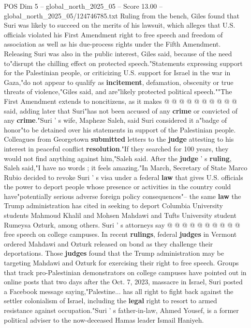 \begin{textsample}{POS Dim 5 – global\_north\_2025\_05 – Score 13.00 – global\_north\_2025\_05/124746785.txt}
Ruling from the bench, Giles found that Suri was likely to succeed on the merits of his lawsuit, which alleges that U.S. officials violated his First Amendment right to free speech and freedom of association as well as his due-process rights under the Fifth Amendment.
Releasing Suri was also in the public interest, Giles said, because of the need to"disrupt the chilling effect on protected speech."Statements expressing support for the Palestinian people, or criticizing U.S. support for Israel in the war in Gaza,"do not appear to qualify as \textbf{incitement}, defamation, obscenity or true threats of violence,"Giles said, and are"likely protected political speech.""The First Amendment extends to noncitizens, as it makes @ @ @ @ @ @ @ @ @ @ said, adding later that Suri"has not been accused of any \textbf{crime} or convicted of any \textbf{crime}."Suri ' s wife, Mapheze Saleh, said Suri considered it a"badge of honor"to be detained over his statements in support of the Palestinian people.
Colleagues from Georgetown \textbf{submitted} letters to the \textbf{judge} attesting to his interest in peaceful conflict \textbf{resolution}."If they searched for 100 years, they would not find anything against him,"Saleh said.
After the \textbf{judge} ' s \textbf{ruling}, Saleh said,"I have no words ; it feels amazing."In March, Secretary of State Marco Rubio decided to revoke Suri ' s visa under a federal \textbf{law} that gives U.S. officials the power to deport people whose presence or activities in the country could have"potentially serious adverse foreign policy consequences"-- the same \textbf{law} the Trump administration has cited in seeking to deport Columbia University students Mahmoud Khalil and Mohsen Mahdawi and Tufts University student Rumeysa Ozturk, among others.
Suri ' s attorneys say @ @ @ @ @ @ @ @ @ @ free speech on college campuses.
In recent \textbf{rulings}, federal \textbf{judges} in Vermont ordered Mahdawi and Ozturk released on bond as they challenge their deportations.
Those \textbf{judges} found that the Trump administration may be targeting Mahdawi and Ozturk for exercising their right to free speech.
Groups that track pro-Palestinian demonstrators on college campuses have pointed out in online posts that two days after the Oct. 7, 2023, massacre in Israel, Suri posted a Facebook message saying,"Palestine... has all right to fight back against the settler colonialism of Israel, including the \textbf{legal} right to resort to armed resistance against occupation."Suri ' s father-in-law, Ahmed Yousef, is a former political adviser to the now-deceased Hamas leader Ismail Haniyeh.

\end{textsample}
